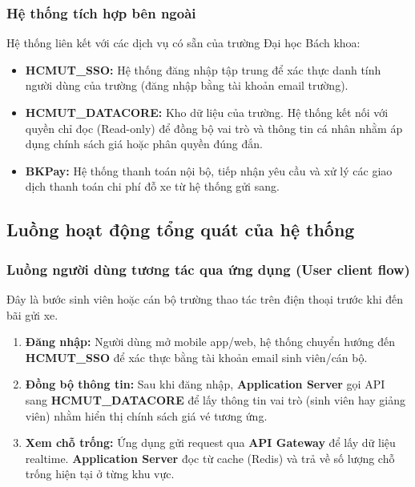\subsubsection{Hệ thống tích hợp bên ngoài}
Hệ thống liên kết với các dịch vụ có sẵn của trường Đại học Bách khoa:
\begin{itemize}
    \item \textbf{HCMUT\_SSO:} Hệ thống đăng nhập tập trung để xác thực danh tính người dùng của trường (đăng nhập bằng tài khoản email trường).
    \item \textbf{HCMUT\_DATACORE:} Kho dữ liệu của trường. Hệ thống kết nối với quyền chỉ đọc (Read-only) để đồng bộ vai trò và thông tin cá nhân nhằm áp dụng chính sách giá hoặc phân quyền đúng đắn.
    \item \textbf{BKPay:} Hệ thống thanh toán nội bộ, tiếp nhận yêu cầu và xử lý các giao dịch thanh toán chi phí đỗ xe từ hệ thống gửi sang.  
\end{itemize}

\subsection{Luồng hoạt động tổng quát của hệ thống}
\subsubsection{Luồng người dùng tương tác qua ứng dụng (User client flow)}
Đây là bước sinh viên hoặc cán bộ trường thao tác trên điện thoại trước khi đến bãi gửi xe.
\begin{enumerate}
    \item \textbf{Đăng nhập:} Người dùng mở mobile app/web, hệ thống chuyển hướng đến \textbf{HCMUT\_SSO} để xác thực bằng tài khoản email sinh viên/cán bộ.
    \item \textbf{Đồng bộ thông tin:} Sau khi đăng nhập, \textbf{Application Server} gọi API sang \textbf{HCMUT\_DATACORE} để lấy thông tin vai trò (sinh viên hay giảng viên) nhằm hiển thị chính sách giá vé tương ứng.
    \item \textbf{Xem chỗ trống:} Ứng dụng gửi request qua \textbf{API Gateway} để lấy dữ liệu realtime. \textbf{Application Server} đọc từ cache (Redis) và trả về số lượng chỗ trống hiện tại ở từng khu vực.
\end{enumerate}

